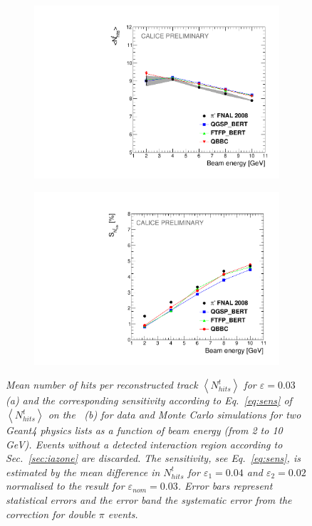 \begin{figure}
	\centering
	\begin{subfigure}{0.5\textwidth}
		\centering
		\includegraphics[width=.90\linewidth]{ECAL/plots/number-graph.pdf}
		\caption{\label{fig:trackshitsgraph}}
	\end{subfigure}%
	\begin{subfigure}{0.5\textwidth}
		\centering
		\includegraphics[width=.90\linewidth]{ECAL/plots/number-graph-delta.pdf}
		\caption{\label{fig:dtrackshitsgraph}}
	\end{subfigure}
	\caption{\label{fig:fulltrackhitsgraph} \sl Mean number of hits per reconstructed track  $\left<N_{hits}^t\right>$ for $\varepsilon = 0.03$  (a) and the corresponding sensitivity according to Eq.~\ref{eq:sens} of  $\left<N_{hits}^t\right>$ on the \ep\, (b) for data and Monte Carlo simulations for two {\sc Geant}4 physics lists as a function of beam energy (from 2 to 10\,GeV). Events without a detected interaction region according to Sec.~\ref{sec:iazone} are discarded. The sensitivity, see Eq.~\ref{eq:sens}, is estimated by the mean difference in $N_{hits}^t$ for $\varepsilon_1 = 0.04$ and $\varepsilon_2 = 0.02$ normalised to the result for $\varepsilon_{nom} = 0.03$. Error bars represent statistical errors and the error band the systematic error from the correction for double $\pi$ events.}
\end{figure}



